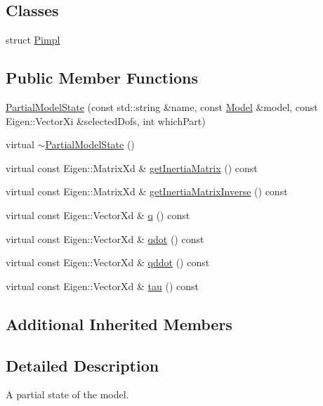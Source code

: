 \subsection*{Classes}
\begin{DoxyCompactItemize}
\item 
struct \hyperlink{structocra_1_1PartialModelState_1_1Pimpl}{Pimpl}
\end{DoxyCompactItemize}
\subsection*{Public Member Functions}
\begin{DoxyCompactItemize}
\item 
\hyperlink{classocra_1_1PartialModelState_aad632d12d35f5982df12d949f92d4937}{Partial\+Model\+State} (const std\+::string \&name, const \hyperlink{classocra_1_1Model}{Model} \&model, const Eigen\+::\+Vector\+Xi \&selected\+Dofs, int which\+Part)
\item 
virtual \hyperlink{classocra_1_1PartialModelState_a59cf8faac5922dc7691c540d519fa705}{$\sim$\+Partial\+Model\+State} ()
\item 
virtual const Eigen\+::\+Matrix\+Xd \& \hyperlink{classocra_1_1PartialModelState_a9fe03ab8c3c4afe56ee4b59f96ac4a25}{get\+Inertia\+Matrix} () const
\item 
virtual const Eigen\+::\+Matrix\+Xd \& \hyperlink{classocra_1_1PartialModelState_a664e4f70861eefde844dca6dd09a2213}{get\+Inertia\+Matrix\+Inverse} () const
\item 
virtual const Eigen\+::\+Vector\+Xd \& \hyperlink{classocra_1_1PartialModelState_ac50f637a2ce55608b4159b7dac2c543d}{q} () const
\item 
virtual const Eigen\+::\+Vector\+Xd \& \hyperlink{classocra_1_1PartialModelState_a8707827d456a8c406d95c1cd4fc2e0b7}{qdot} () const
\item 
virtual const Eigen\+::\+Vector\+Xd \& \hyperlink{classocra_1_1PartialModelState_a9be011bf4005c0b964f857a82b2b2b23}{qddot} () const
\item 
virtual const Eigen\+::\+Vector\+Xd \& \hyperlink{classocra_1_1PartialModelState_a286258284aa61c902106a6b0fcdde9ca}{tau} () const
\end{DoxyCompactItemize}
\subsection*{Additional Inherited Members}


\subsection{Detailed Description}
A partial state of the model. 

